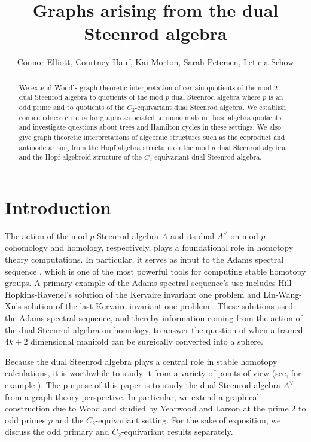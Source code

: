 \documentclass{amsart}
\title{Graphs arising from the dual Steenrod algebra}
\author{Connor Elliott, Courtney Hauf, Kai Morton, Sarah Petersen, Leticia Schow}
\theoremstyle{definition}
\theoremstyle{plain}
\numberwithin{theorem}{section}
\numberwithin{equation}{section}
\numberwithin{figure}{section}
\newcommand{\0}{\langle 0 \rangle }
\begin{document}
\begin{abstract}
We extend Wood's graph theoretic interpretation of certain quotients of the mod $2$ dual Steenrod algebra to quotients of the mod $p$ dual Steenrod algebra where $p$ is an odd prime and to quotients of the $C_2$-equivariant dual Steenrod algebra. We establish connectedness criteria for graphs associated to monomials in these algebra quotients and investigate questions about trees and Hamilton cycles in these settings. We also give graph theoretic interpretations of algebraic structures such as the coproduct and antipode arising from the Hopf algebra structure on the mod $p$ dual Steenrod algebra and the Hopf algebroid structure of the $C_2$-equivariant dual Steenrod algebra. 


\end{abstract}
\maketitle
\tableofcontents

\section{Introduction}
The action of the mod $p$ Steenrod algebra $A$ and its dual ${A}^\vee$ on mod $p$ cohomology and homology, respectively, plays a foundational role in homotopy theory computations. In particular, it serves as input to the Adams spectral sequence \cite{Adams58}, which is one of the most powerful tools for computing stable homotopy groups. A primary example of the Adams spectral sequence's use includes Hill-Hopkins-Ravenel's solution of the Kervaire invariant one problem and Lin-Wang-Xu's solution of the last Kervaire invariant one problem \cite{HillHopkinsRavenel16,LinWangXu25}. These solutions used the Adams spectral sequence, and thereby information coming from the action of the dual Steenrod algebra on homology, to answer the question of when a framed $4k + 2$ dimensional manifold can be surgically converted into a sphere. 

Because the dual Steenrod algebra plays a central role in stable homotopy calculations, it is worthwhile to study it from a variety of points of view (see, for example \cite{Smith07,WalkerWood18a,WalkerWood18b,Wood97}). The purpose of this paper is to study the dual Steenrod algebra $A^\vee$ from a graph theory perspective. In particular, we extend a graphical construction due to Wood \cite[]{Wood98} and studied by Yearwood \cite{Yearwood19} and Larson \cite{Larson22} at the prime $2$ to odd primes $p$ and the $C_2$-equivariant setting. For the sake of exposition, we discuss the odd primary and $C_2$-equivariant results separately.
\end{document}
